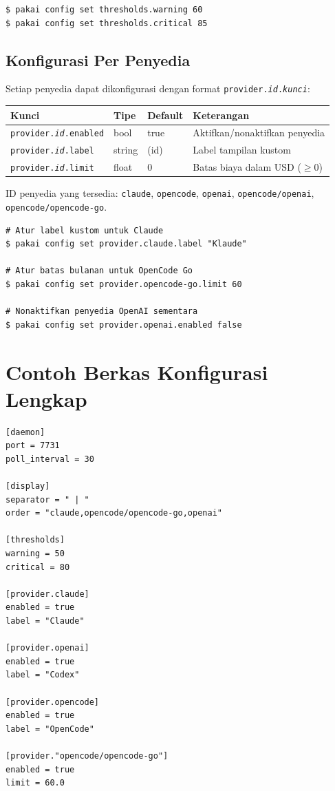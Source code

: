 \begin{lstlisting}[style=terminal]
$ pakai config set thresholds.warning 60
$ pakai config set thresholds.critical 85
\end{lstlisting}

\subsection{Konfigurasi Per Penyedia}

Setiap penyedia dapat dikonfigurasi dengan format \texttt{provider.\textit{id}.\textit{kunci}}:

\begin{center}
\begin{tabular}{lllp{4.5cm}}
\toprule
\textbf{Kunci} & \textbf{Tipe} & \textbf{Default} & \textbf{Keterangan} \\
\midrule
\texttt{provider.\textit{id}.enabled} & bool & true & Aktifkan/nonaktifkan penyedia \\
\texttt{provider.\textit{id}.label} & string & (id) & Label tampilan kustom \\
\texttt{provider.\textit{id}.limit} & float & 0 & Batas biaya dalam USD ($\geq 0$) \\
\bottomrule
\end{tabular}
\end{center}

ID penyedia yang tersedia: \texttt{claude}, \texttt{opencode}, \texttt{openai},
\texttt{opencode/openai}, \texttt{opencode/opencode-go}.

\begin{lstlisting}[style=terminal]
# Atur label kustom untuk Claude
$ pakai config set provider.claude.label "Klaude"

# Atur batas bulanan untuk OpenCode Go
$ pakai config set provider.opencode-go.limit 60

# Nonaktifkan penyedia OpenAI sementara
$ pakai config set provider.openai.enabled false
\end{lstlisting}

\section{Contoh Berkas Konfigurasi Lengkap}

\begin{lstlisting}[style=toml]
[daemon]
port = 7731
poll_interval = 30

[display]
separator = " | "
order = "claude,opencode/opencode-go,openai"

[thresholds]
warning = 50
critical = 80

[provider.claude]
enabled = true
label = "Claude"

[provider.openai]
enabled = true
label = "Codex"

[provider.opencode]
enabled = true
label = "OpenCode"

[provider."opencode/opencode-go"]
enabled = true
limit = 60.0
\end{lstlisting}

